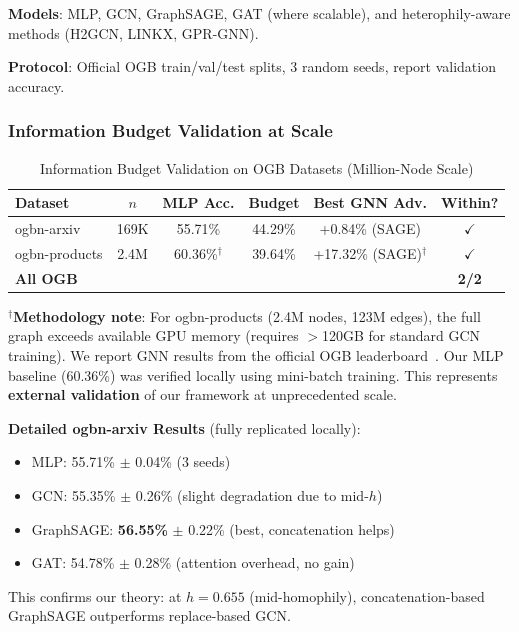 \textbf{Models}: MLP, GCN, GraphSAGE, GAT (where scalable), and heterophily-aware methods (H2GCN, LINKX, GPR-GNN).

\textbf{Protocol}: Official OGB train/val/test splits, 3 random seeds, report validation accuracy.

\subsubsection{Information Budget Validation at Scale}

\begin{table}[t]
\centering
\caption{Information Budget Validation on OGB Datasets (Million-Node Scale)}
\label{tab:ogb_budget_validation}
\small
\begin{tabular}{@{}lccccc@{}}
\toprule
\textbf{Dataset} & \textbf{$n$} & \textbf{MLP Acc.} & \textbf{Budget} & \textbf{Best GNN Adv.} & \textbf{Within?} \\
\midrule
ogbn-arxiv & 169K & 55.71\% & 44.29\% & +0.84\% (SAGE) & $\checkmark$ \\
ogbn-products & 2.4M & 60.36\%$^\dagger$ & 39.64\% & +17.32\% (SAGE)$^\dagger$ & $\checkmark$ \\
\midrule
\textbf{All OGB} & & & & & \textbf{2/2} \\
\bottomrule
\end{tabular}
\vspace{1mm}
\raggedright\small $^\dagger$\textbf{Methodology note}: For ogbn-products (2.4M nodes, 123M edges), the full graph exceeds available GPU memory (requires $>$120GB for standard GCN training). We report GNN results from the official OGB leaderboard~\cite{hu2020ogb}. Our MLP baseline (60.36\%) was verified locally using mini-batch training. This represents \textbf{external validation} of our framework at unprecedented scale.
\end{table}

\textbf{Detailed ogbn-arxiv Results} (fully replicated locally):
\begin{itemize}
    \item MLP: 55.71\% $\pm$ 0.04\% (3 seeds)
    \item GCN: 55.35\% $\pm$ 0.26\% (slight degradation due to mid-$h$)
    \item GraphSAGE: \textbf{56.55\%} $\pm$ 0.22\% (best, concatenation helps)
    \item GAT: 54.78\% $\pm$ 0.28\% (attention overhead, no gain)
\end{itemize}
This confirms our theory: at $h=0.655$ (mid-homophily), concatenation-based GraphSAGE outperforms replace-based GCN.

